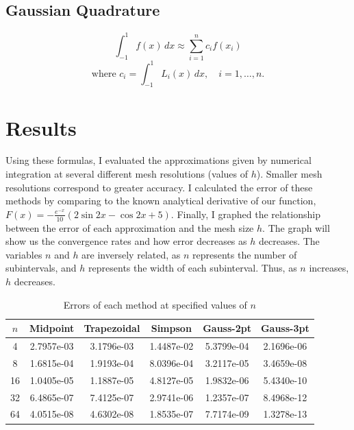 \documentclass{article}
\begin{document}
\subsection*{Gaussian Quadrature}
\begin{equation}
\int_{-1}^{1} f(x) \, dx \approx \sum_{i=1}^{n} c_i f(x_i)
\end{equation}
\begin{equation}
\text{where } c_i = \int_{-1}^{1} L_i(x) \, dx, \quad i = 1, \dots, n.
\end{equation}

\section{Results}
Using these formulas, I evaluated the approximations given by numerical integration at several different mesh 
resolutions (values of $h$). Smaller mesh resolutions correspond to greater accuracy. I calculated the error 
of these methods by comparing to the known analytical derivative of our function, $F(x) = -\frac{e^{-x}}{10}(2\sin{2x}-\cos{2x}+5)$. 
Finally, I graphed the relationship between the error of each approximation and the mesh size $h$. The graph will 
show us the convergence rates and how error decreases as $h$ decreases. The variables $n$ and $h$ are inversely related, as $n$ 
represents the number of subintervals, and $h$ represents the width of each subinterval. Thus, as $n$ increases, $h$ decreases.
\begin{table}[h]
\centering
\caption{Errors of each method at specified values of $n$}
\label{tab:method_errors}
\begin{tabular}{|c|c|c|c|c|c|}
\hline
$n$ & Midpoint & Trapezoidal & Simpson & Gauss-2pt & Gauss-3pt \\
\hline
4  & 2.7957e-03 & 3.1796e-03 & 1.4487e-02 & 5.3799e-04 & 2.1696e-06 \\
8  & 1.6815e-04 & 1.9193e-04 & 8.0396e-04 & 3.2117e-05 & 3.4659e-08 \\
16 & 1.0405e-05 & 1.1887e-05 & 4.8127e-05 & 1.9832e-06 & 5.4340e-10 \\
32 & 6.4865e-07 & 7.4125e-07 & 2.9741e-06 & 1.2357e-07 & 8.4968e-12 \\
64 & 4.0515e-08 & 4.6302e-08 & 1.8535e-07 & 7.7174e-09 & 1.3278e-13 \\
\hline
\end{tabular}
\end{table}
\end{document}
